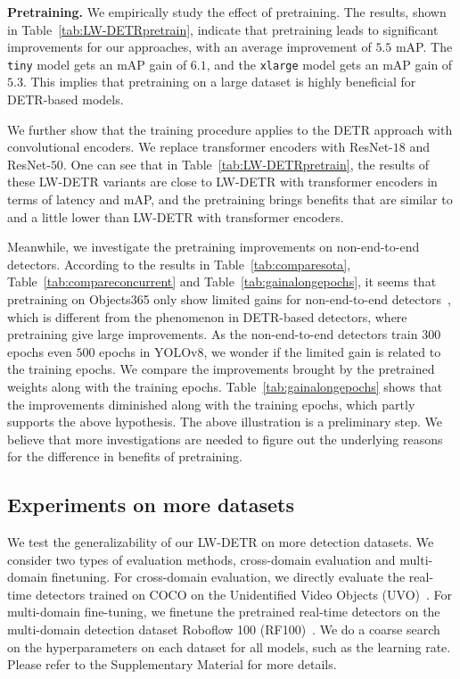 \documentclass[runningheads]{llncs}
\begin{document}
\noindent\textbf{Pretraining.} We empirically study the effect of pretraining. The results, shown in Table~\ref{tab:LW-DETRpretrain}, indicate that pretraining leads to significant improvements for our approaches, with an average improvement of $5.5$ mAP. The \texttt{tiny} model gets an mAP gain of $6.1$, and the \texttt{xlarge} model gets an mAP gain of $5.3$. This implies that pretraining on a large dataset is highly beneficial for DETR-based models.

We further show that the training procedure applies to the DETR approach with convolutional encoders. We replace transformer encoders with ResNet-$18$ and ResNet-$50$. One can see that in 
Table~\ref{tab:LW-DETRpretrain}, 
the results of these LW-DETR variants are close to LW-DETR with transformer encoders in terms of latency and mAP, 
and the pretraining brings benefits
that are similar to and a little lower than 
LW-DETR with transformer encoders.

Meanwhile, we investigate the pretraining improvements on non-end-to-end detectors. 
According to the results in Table~\ref{tab:comparesota}, Table~\ref{tab:compareconcurrent} and Table~\ref{tab:gainalongepochs}, it seems that pretraining on Objects365 only show limited gains for non-end-to-end detectors~\cite{lyu2022rtmdet,yolov8_ultralytics,chen2023yolo,wang2023gold}, which is different from the phenomenon in DETR-based detectors, where pretraining give large improvements. As the non-end-to-end detectors train $300$ epochs even $500$ epochs in YOLOv8, we wonder if the limited gain is related to the training epochs. We compare the improvements brought by the pretrained weights along with the training epochs. Table~\ref{tab:gainalongepochs} shows that the improvements diminished along with the training epochs, which partly supports the above hypothesis. The above illustration is a preliminary step. We believe that more investigations are needed to figure out the underlying reasons for the difference in benefits of pretraining.


\subsection{Experiments on more datasets}
We test the generalizability of our LW-DETR on more detection datasets. We consider two types of evaluation methods, cross-domain evaluation and multi-domain finetuning. For cross-domain evaluation, we directly evaluate the real-time detectors trained on COCO on the Unidentified Video Objects (UVO)~\cite{wang2021unidentified}. For multi-domain fine-tuning, we finetune the pretrained real-time detectors on the multi-domain detection dataset Roboflow 100 (RF100)~\cite{ciaglia2022roboflow}. We do a coarse search on the hyperparameters on each dataset for all models, such as the learning rate. Please refer to the Supplementary Material for more details.
\end{document}
